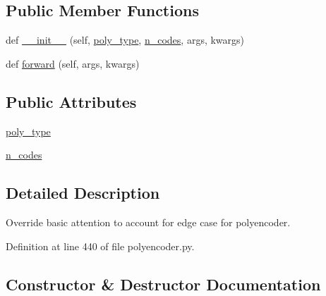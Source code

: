 \subsection*{Public Member Functions}
\begin{DoxyCompactItemize}
\item 
def \hyperlink{classparlai_1_1agents_1_1transformer_1_1polyencoder_1_1PolyBasicAttention_a421bbb5dad363d0d16be9ab49b13a4e3}{\+\_\+\+\_\+init\+\_\+\+\_\+} (self, \hyperlink{classparlai_1_1agents_1_1transformer_1_1polyencoder_1_1PolyBasicAttention_aa82d4585cb9a4f671353565fcc0785ab}{poly\+\_\+type}, \hyperlink{classparlai_1_1agents_1_1transformer_1_1polyencoder_1_1PolyBasicAttention_a45603a52525744549d48b10e0bd1b63c}{n\+\_\+codes}, args, kwargs)
\item 
def \hyperlink{classparlai_1_1agents_1_1transformer_1_1polyencoder_1_1PolyBasicAttention_a6927374c5336d0111ab936c1fd2b62ff}{forward} (self, args, kwargs)
\end{DoxyCompactItemize}
\subsection*{Public Attributes}
\begin{DoxyCompactItemize}
\item 
\hyperlink{classparlai_1_1agents_1_1transformer_1_1polyencoder_1_1PolyBasicAttention_aa82d4585cb9a4f671353565fcc0785ab}{poly\+\_\+type}
\item 
\hyperlink{classparlai_1_1agents_1_1transformer_1_1polyencoder_1_1PolyBasicAttention_a45603a52525744549d48b10e0bd1b63c}{n\+\_\+codes}
\end{DoxyCompactItemize}


\subsection{Detailed Description}
\begin{DoxyVerb}Override basic attention to account for edge case for polyencoder.\end{DoxyVerb}
 

Definition at line 440 of file polyencoder.\+py.



\subsection{Constructor \& Destructor Documentation}
\mbox{\label{classparlai_1_1agents_1_1transformer_1_1polyencoder_1_1PolyBasicAttention_a421bbb5dad363d0d16be9ab49b13a4e3}} 
